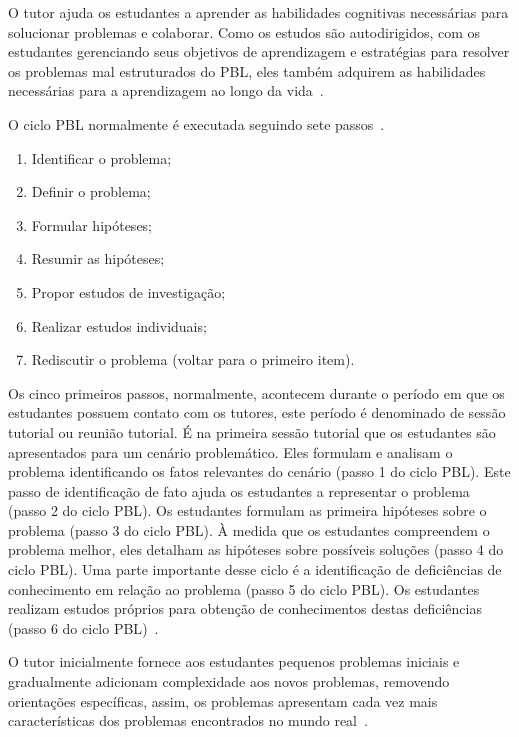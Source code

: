 O tutor ajuda os estudantes a aprender as habilidades cognitivas
necessárias para solucionar problemas e colaborar.
Como os estudos são autodirigidos, com os estudantes gerenciando
seus objetivos de aprendizagem e estratégias
para resolver os problemas mal estruturados do \ac{PBL}, eles
também adquirem as habilidades necessárias para a
aprendizagem ao longo da vida~\cite{hmelo2004problem}.


O ciclo \ac{PBL} normalmente é executada seguindo sete
passos~\cite{de2014aprendizado,conrado2014aprendizagem}.

\begin{enumerate}
\item{Identificar o problema;}
\item{Definir o problema;}
\item{Formular hipóteses;}
\item{Resumir as hipóteses;}
\item{Propor estudos de investigação;}
\item{Realizar estudos individuais;}
\item{Rediscutir o problema (voltar para o primeiro item).}
\end{enumerate}

Os cinco primeiros passos, normalmente, acontecem durante o período
em que os estudantes possuem contato com os tutores, este período é
denominado de sessão tutorial ou reunião tutorial.
É na primeira sessão tutorial que os estudantes
são apresentados para um cenário problemático.
Eles formulam e analisam o problema identificando os fatos
relevantes do cenário (passo 1 do ciclo \ac{PBL}).
Este passo de identificação de fato ajuda os estudantes
a representar o problema (passo 2 do ciclo \ac{PBL}).
Os estudantes formulam as primeira hipóteses sobre o
problema (passo 3 do ciclo \ac{PBL}).
À medida que os estudantes compreendem o problema melhor, eles detalham
as hipóteses sobre possíveis soluções (passo 4 do ciclo \ac{PBL}).
Uma parte importante desse ciclo é a identificação de deficiências
de conhecimento em relação ao problema (passo 5 do ciclo \ac{PBL}).
Os estudantes realizam estudos próprios para obtenção de
conhecimentos destas deficiências
(passo 6 do ciclo \ac{PBL})~\cite{hmelo2004problem}.

O tutor inicialmente fornece aos estudantes
pequenos problemas iniciais e gradualmente adicionam
complexidade aos novos problemas, removendo orientações
específicas, assim, os problemas apresentam cada vez mais
características dos problemas encontrados no mundo
real~\cite{fee2010teaching}.

